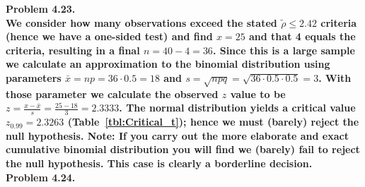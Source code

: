 \noindent
\bf{Problem 4.23.} \\

We consider how many observations exceed the stated $\tilde{\rho} \leq 2.42$ criteria (hence we
have a one-sided test) and
find $x = 25$ and that 4 equals the criteria, resulting in a final $n = 40 - 4 = 36$.  Since this is
a large sample we calculate an approximation to the binomial distribution using parameters
$\bar{x} = np = 36\cdot0.5 = 18$ and $s = \sqrt{npq} = \sqrt{36\cdot0.5\cdot0.5} = 3$.  With those
parameter we calculate the observed $z$ value to be $z = \frac{x - \bar{x}}{s} = \frac{25 - 18}{3} = 2.3333$.
The normal distribution yields a critical value $z_{0.99} = 2.3263$ (Table~\ref{tbl:Critical_t}); hence
we must (barely) reject the null hypothesis.  Note: If you carry out the more elaborate and exact cumulative
binomial distribution you will find we (barely) fail to reject the null hypothesis.  This case is clearly a
borderline decision.
\\

\noindent
\bf{Problem 4.24.} \\

